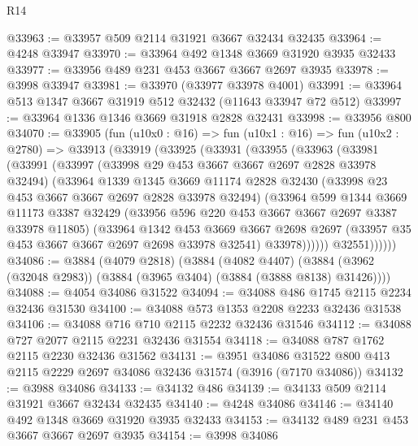 \begin{lexlean}{R14}
\begin{coremodule}
@33963 := @33957 @509 @2114 @31921 @3667 @32434 @32435
@33964 := @4248 @33947
@33970 := @33964 @492 @1348 @3669 @31920 @3935 @32433
@33977 := @33956 @489 @231 @453 @3667 @3667 @2697 @3935
@33978 := @3998 @33947
@33981 := @33970 (@33977 @33978 @4001)
@33991 := @33964 @513 @1347 @3667 @31919 @512 @32432 (@11643 @33947 @72 @512)
@33997 := @33964 @1336 @1346 @3669 @31918 @2828 @32431
@33998 := @33956 @800
@34070 := @33905
    (fun (u10x0 : @16) =>
    fun (u10x1 : @16) =>
    fun (u10x2 : @2780) =>
    @33913
      (@33919
        (@33925
          (@33931
            (@33955
              (@33963
                (@33981
                  (@33991
                    (@33997
                      (@33998 @29 @453 @3667 @3667 @2697 @2828 @33978 @32494)
                      (@33964
                        @1339
                        @1345
                        @3669
                        @11174
                        @2828
                        @32430
                        (@33998 @23 @453 @3667 @3667 @2697 @2828 @33978 @32494)
                        (@33964
                          @599
                          @1344
                          @3669
                          @11173
                          @3387
                          @32429
                          (@33956 @596 @220 @453 @3667 @3667 @2697 @3387 @33978 @11805)
                          (@33964
                            @1342
                            @453
                            @3669
                            @3667
                            @2698
                            @2697
                            (@33957 @35 @453 @3667 @3667 @2697 @2698 @33978 @32541)
                            @33978))))))
                @32551))))))
@34086 := @3884
    (@4079 @2818)
    (@3884
      (@4082 @4407)
      (@3884 (@3962 (@32048 @2983)) (@3884 (@3965 @3404) (@3884 (@3888 @8138) @31426))))
@34088 := @4054 @34086 @31522
@34094 := @34088 @486 @1745 @2115 @2234 @32436 @31530
@34100 := @34088 @573 @1353 @2208 @2233 @32436 @31538
@34106 := @34088 @716 @710 @2115 @2232 @32436 @31546
@34112 := @34088 @727 @2077 @2115 @2231 @32436 @31554
@34118 := @34088 @787 @1762 @2115 @2230 @32436 @31562
@34131 := @3951
    @34086
    @31522
    @800
    @413
    @2115
    @2229
    @2697
    @34086
    @32436
    @31574
    (@3916 (@7170 @34086))
@34132 := @3988 @34086
@34133 := @34132 @486
@34139 := @34133 @509 @2114 @31921 @3667 @32434 @32435
@34140 := @4248 @34086
@34146 := @34140 @492 @1348 @3669 @31920 @3935 @32433
@34153 := @34132 @489 @231 @453 @3667 @3667 @2697 @3935
@34154 := @3998 @34086

\end{coremodule}
\end{lexlean}
